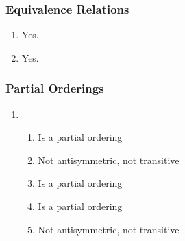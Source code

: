 \documentclass{sig-alternate-05-2015}
\begin{document}
\subsubsection{Equivalence Relations}
\begin{enumerate}
\begin{enumerate}
	\item $R$ is
	reflexive because any coloring can be obtained from itself via
	a 360-degree rotation. To see that $R$ is symmetric and transitive,
	use the fact that each rotation is the composition of two reflections and conversely the composition of two reflections
	is a rotation. Hence, $(B_1, B_2)$ belongs to $R$ if and only
	if $B_2$ can be obtained from $B_1$ by a composition of reflections.
	So if $(B_1, B_2)$ belongs to $R$, so does $(B_2, B_1)$ because
	the inverse of the composition of reflections is also a composition
	of reflections (in the opposite order). Hence, $R$ is
	symmetric. To see that $R$ is transitive, suppose $(B_1, B_2)$ and
	$(B_2, B_3)$ belong to $R$. Taking the composition of the reflections
	in each case yields a composition of reflections, showing
	that $(B_1,B_3)$ belongs to $R$. 
	\item We express colorings with sequences
	of length four, with $r$, $w$ and $b$ denoting red, white and blue,
	respectively. We list letters denoting the colors of the upper
	ball, right ball, and left ball, in that order. The equivalence classes are: $\{rrr\}$, $\{www\}$, $\{bbb\}$, $\{rrw, rwr, wrr\}$, $\{rrb, rbr, brr\}$, $\{wwr, wrw, rww\}$, $\{wwb, wbw, bww\}$, $\{bbr, brb, rbb\}$, $\{bbw, bwb, wbb\}$.
\end{enumerate}

\item Yes.

\item Yes.
\end{enumerate}

\subsubsection{Partial Orderings}
\begin{enumerate}
\item 
\begin{enumerate}
	\item Is a partial ordering 
	\item Not antisymmetric, not transitive 
	\item Is a partial ordering 
	\item Is a partial ordering 
	\item Not antisymmetric, not transitive
\end{enumerate}
\end{enumerate}
\end{document}
